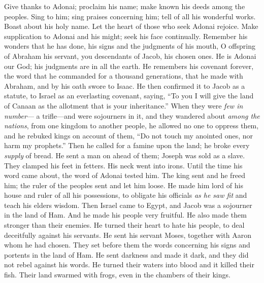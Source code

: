 \begin{biblechapter} %
 Give thanks to Adonai; proclaim his name; 
make known his deeds among the peoples.
\verse Sing to him; sing praises concerning him; 
tell of all his wonderful works.
\verse Boast about his holy name. 
Let the heart of those who seek Adonai rejoice.
\verse Make supplication to Adonai and his might; 
seek his face continually.
\verse Remember his wonders that he has done, 
his signs and the judgments of his mouth,
\verse O offspring of Abraham his servant, 
you descendants of Jacob, his chosen ones.
\verse He is Adonai our God; 
his judgments are in all the earth.
\verse He remembers his covenant forever, 
the word that he commanded 
for a thousand generations,
\verse that he made with Abraham, 
and by his oath swore to Isaac.
\verse He then confirmed it to Jacob as a statute, 
to Israel as an everlasting covenant,
\verse saying, “To you I will give the land of Canaan 
as the allotment that is your inheritance.”
\verse When they were \textit{few in number}— 
a trifle—and were sojourners in it,
\verse and they wandered about \textit{among the nations}, 
from one kingdom to another people,
\verse he allowed no one to oppress them, 
and he rebuked kings on account of them,
\verse “Do not touch my anointed ones, 
nor harm my prophets.”
\verse Then he called for a famine upon the land; 
he broke every \textit{supply} of bread.
\verse He sent a man on ahead of them; 
Joseph was sold as a slave.
\verse They clamped his feet in fetters. 
His neck went into irons.
\verse Until the time his word came about, 
the word of Adonai tested him.
\verse The king sent and he freed him; 
the ruler of the peoples sent and let him loose.
\verse He made him lord of his house 
and ruler of all his possessions,
\verse to obligate his officials \textit{as he saw fit} 
and teach his elders wisdom.
\verse Then Israel came to Egypt, 
and Jacob was a sojourner in the land of Ham.
\verse And he made his people very fruitful. 
He also made them stronger than their enemies.
\verse He turned their heart to hate his people, 
to deal deceitfully against his servants.
\verse He sent his servant Moses, 
together with Aaron whom he had chosen.
\verse They set before them the words concerning his signs 
and portents in the land of Ham.
\verse He sent darkness and made it dark, 
and they did not rebel against his words.
\verse He turned their waters into blood 
and it killed their fish.
\verse Their land swarmed with frogs, 
even in the chambers of their kings.

\end{biblechapter}
